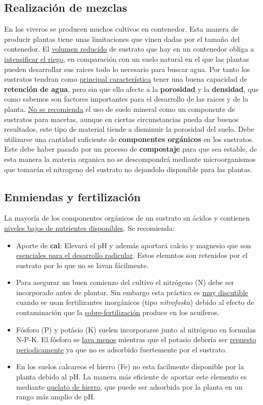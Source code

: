 \documentclass[a4paper,12pt,oneside]{article}
\begin{document}
\subsection{Realización de mezclas}
\label{sec:org79a5b48}
En los viveros se producen muchos cultivos en contenedor. Esta manera de
producir plantas tiene unas limitaciones que vinen dadas por el tamaño del
contenedor. El \uline{volumen reducido} de sustrato que hay en un contenedor obliga a
\uline{intensificar el riego}, en comparación con un suelo natural en el que las
plantas pueden desarrollar sus raices todo lo necesario para buscar agua. Por
tanto los sustratos tendran como \uline{principal característica} tener una buena
capacidad de \textbf{retención de agua}, pero sin que ello afecte a la \textbf{porosidad} y la
\textbf{densidad}, que como sabemos son factores importantes para el desarrollo de las
raices y de la planta.
\uline{No se recomienda} el uso de suelo mineral como un componente de sustratos para
macetas, aunque en ciertas circunstancias pueda dar buenos resultados, este tipo
de material tiende a disminuir la porosidad del suelo.
Debe utilizarse una cantidad suficiente de \textbf{componentes orgánicos} en los
sustratos. Este debe haber pasado por un proceso de \textbf{compostaje} para que sea
estable, de esta manera la materia organica no se descompondrá mediante
microorganismos que tomarán el nitrogeno del sustrato no dejandolo disponible
para las plantas.
\subsection{Enmiendas y fertilización}
\label{sec:org6013e54}
La mayoría de los componentes orgánicos de un sustrato sn ácidos y contienen
\uline{niveles bajos de nutrientes disponibles}. Se recomienda:
\begin{itemize}
\item Aporte de \textbf{cal}: Elevará el pH y además aportará calcio y magnesio que son
\uline{esenciales para el desarrollo radicular}. Estos elemntos son retenidos por el
sustrato por lo que no se lavan fácilmente.
\item Para asegurar un buen comienzo del cultivo el nitrógeno (N) debe ser incorporado
antes de plantar. Sin embargo esta práctica es \uline{muy discutible} cuando se usan
fertilizantes inorgánicos (tipo \emph{nitrofoska}) debido al efecto de
contaminación que la \uline{sobre-fertilización} produce en los acuiferos.
\item Fósforo (P) y potásio (K) suelen incorporarse junto al nitrógeno en formulas
N-P-K. El fósforo se \uline{lava menos} mientras que el potasio debería ser
\uline{repuesto periodicamente} ya que no es adsorbido fuertemente por el sustrato.
\item En los suelos calcareos el hierro (Fe) no esta facilmente disponible por la
planta debido al pH. La manera más eficiente de aportar este elemento es
mediante \uline{quelato de hierro}, que puede ser adsorbida por la planta en un
rango más amplio de pH.
\end{itemize}
\end{document}
